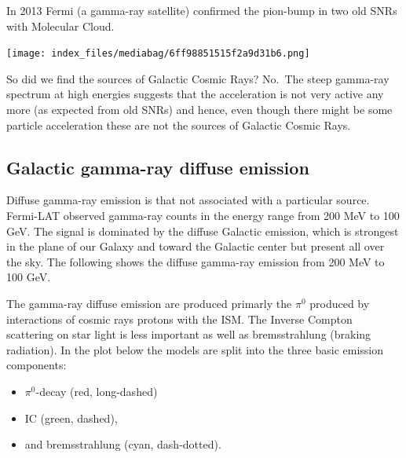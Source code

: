 \documentclass[
  letterpaper,
  DIV=11,
  numbers=noendperiod]{scrreprt}
\providecommand{\tightlist}{%
  \setlength{\itemsep}{0pt}\setlength{\parskip}{0pt}}\usepackage{longtable,booktabs,array}
\begin{document}
In 2013 Fermi (a gamma-ray satellite) confirmed the pion-bump in two old
SNRs with Molecular Cloud.

\texttt{[image: index\_files/mediabag/6ff98851515f2a9d31b6.png]}

So did we find the sources of Galactic Cosmic Rays? No.~The steep
gamma-ray spectrum at high energies suggests that the acceleration is
not very active any more (as expected from old SNRs) and hence, even
though there might be some particle acceleration these are not the
sources of Galactic Cosmic Rays.

\subsection{Galactic gamma-ray diffuse
emission}\label{galactic-gamma-ray-diffuse-emission}

Diffuse gamma-ray emission is that not associated with a particular
source. Fermi-LAT observed gamma-ray counts in the energy range from 200
MeV to 100 GeV. The signal is dominated by the diffuse Galactic
emission, which is strongest in the plane of our Galaxy and toward the
Galactic center but present all over the sky. The following shows the
diffuse gamma-ray emission from 200 MeV to 100 GeV.

The gamma-ray diffuse emission are produced primarly the \(\pi^0\)
produced by interactions of cosmic rays protons with the ISM. The
Inverse Compton scattering on star light is less important as well as
bremsstrahlung (braking radiation). In the plot below the models are
split into the three basic emission components:

\begin{itemize}
\tightlist
\item
  \(\pi^0\)-decay (red, long-dashed)
\item
  IC (green, dashed),
\item
  and bremsstrahlung (cyan, dash-dotted).
\end{itemize}
\end{document}
